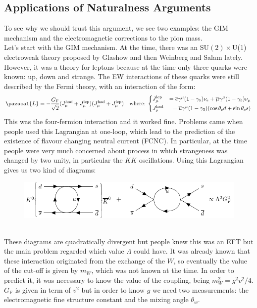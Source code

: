 \documentclass[../main.tex]{subfiles}
\begin{document}
\subsection{Applications of Naturalness Arguments}
To see why we should trust this argument, we see two examples: the GIM mechanism and the electromagnetic corrections to the pion mass.\\
Let's start with the GIM mechanism. At the time, there was an SU$(2)\times$U(1) electroweak theory proposed by Glashow and then Weinberg and Salam lately. However, it was a theory for leptons because at the time only three quarks were known: up, down and strange. The EW interactions of these quarks were still described by the Fermi theory, with an interaction of the form:
\[
\pazocal{L}=-\frac{G_{\text{F}}}{\sqrt{2}}(J_\mu^{\text{had}}+J_\mu^{\text{lep}})(J_\mu^{\text{had}}+J_\mu^{\text{lep}}) \quad \text{where:}\;\left\{
\begin{aligned}
&J_\mu^{\text{lep}}&=\overline{e}\gamma^\mu(1-\gamma_5)\nu_e+\overline{\mu}\gamma^\mu(1-\gamma_5)\nu_\mu\\
&J_\mu^{\text{had}}&=\overline{u}\gamma^\mu(1-\gamma_5)(\cos\theta_cd+\sin\theta_cs)
\end{aligned}
\right.
\]
This was the four-fermion interaction and it worked fine. Problems came when people used this Lagrangian at one-loop, which lead to the prediction of the existence of flavour changing neutral current (FCNC). In particular, at the time people were very much concerned about process in which strangeness was changed by two unity, in particular the $K\overline{K}$ oscillations. Using this Lagrangian gives us two kind of diagrams:
\begin{figure}[h]
    \centering
    \includegraphics{Images/kk.pdf}
    \caption*{}
\end{figure}\\
These diagrams are quadratically divergent but people knew this was an EFT but the main problem regarded which value $\Lambda$ could have. It was already known that these interaction originated from the exchange of the $W$, so eventually the value of the cut-off is given by $m_W$, which was not known at the time. In order to predict it, it was necessary to know the value of the coupling, being $m_W^2=g^2v^2/4$. $G_{\text{F}}$ is given in term of $v^2$ but in order to know $g$ we need two measurements: the electromagnetic fine structure constant and the mixing angle $\theta_w$. 
\end{document}
